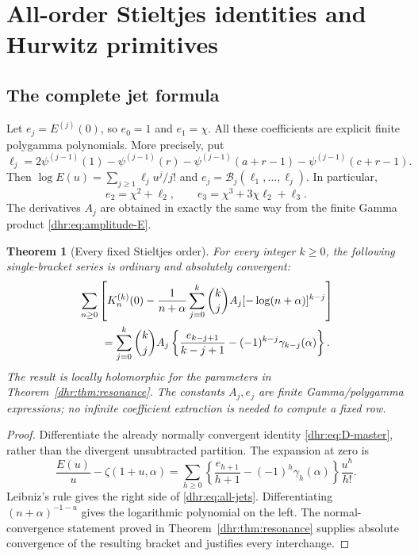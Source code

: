 \documentclass[11pt,letterpaper]{article}
\numberwithin{equation}{section}
\newtheorem{theorem}{Theorem}[section]
\theoremstyle{definition}\newtheorem{definition}[theorem]{Definition}
\theoremstyle{remark}\newtheorem{remark}[theorem]{Remark}
\newcommand{\Bell}{\mathcal B}
\begin{document}
\section{All-order Stieltjes identities and Hurwitz primitives}
\label{dhr:sec:stieltjes}

\subsection{The complete jet formula}
Let $e_j=E^{(j)}(0)$, so $e_0=1$ and $e_1=\chi$. All these
coefficients are explicit finite polygamma polynomials. More precisely,
put
\begin{equation}\label{dhr:eq:ell}
 \ell_j=2\psi^{(j-1)}(1)-\psi^{(j-1)}(r)
        -\psi^{(j-1)}(a+r-1)-\psi^{(j-1)}(c+r-1).
\end{equation}
Then $\log E(u)=\sum_{j\geq1}\ell_j u^j/j!$ and
$e_j=\Bell_j(\ell_1,\ldots,\ell_j)$. In particular,
\[
 e_2=\chi^2+\ell_2,\qquad
 e_3=\chi^3+3\chi\ell_2+\ell_3.
\]
The derivatives $A_j$ are obtained in exactly the same way from the
finite Gamma product \eqref{dhr:eq:amplitude-E}.

\begin{theorem}[Every fixed Stieltjes order]\label{dhr:thm:jets}
For every integer $k\geq0$, the following single-bracket series is
ordinary and absolutely convergent:
\begin{align}
 &\sum_{n\geq0}\left[
 K_n^{(k)}(0)-\frac1{n+\alpha}
 \sum_{j=0}^k\binom{k}{j}A_j[-\log(n+\alpha)]^{k-j}
 \right]\notag\\
 &\qquad=\sum_{j=0}^k\binom{k}{j}A_j
 \left\{\frac{e_{k-j+1}}{k-j+1}
       -(-1)^{k-j}\gamma_{k-j}(\alpha)\right\}.
 \label{dhr:eq:all-jets}
\end{align}
The result is locally holomorphic for the parameters in
Theorem~\ref{dhr:thm:resonance}. The constants $A_j,e_j$ are finite
Gamma/polygamma expressions; no infinite coefficient extraction is
needed to compute a fixed row.
\end{theorem}
\begin{proof}
Differentiate the already normally convergent identity
\eqref{dhr:eq:D-master}, rather than the divergent unsubtracted
partition. The expansion at zero is
\[
 \frac{E(u)}u-\zeta(1+u,\alpha)
 =\sum_{h\geq0}\left\{\frac{e_{h+1}}{h+1}
               -(-1)^h\gamma_h(\alpha)\right\}\frac{u^h}{h!}.
\]
Leibniz's rule gives the right side of \eqref{dhr:eq:all-jets}.
Differentiating $(n+\alpha)^{-1-u}$ gives the logarithmic polynomial
on the left. The normal-convergence statement proved in
Theorem~\ref{dhr:thm:resonance} supplies absolute convergence of the
resulting bracket and justifies every interchange.
\end{proof}
\end{document}
